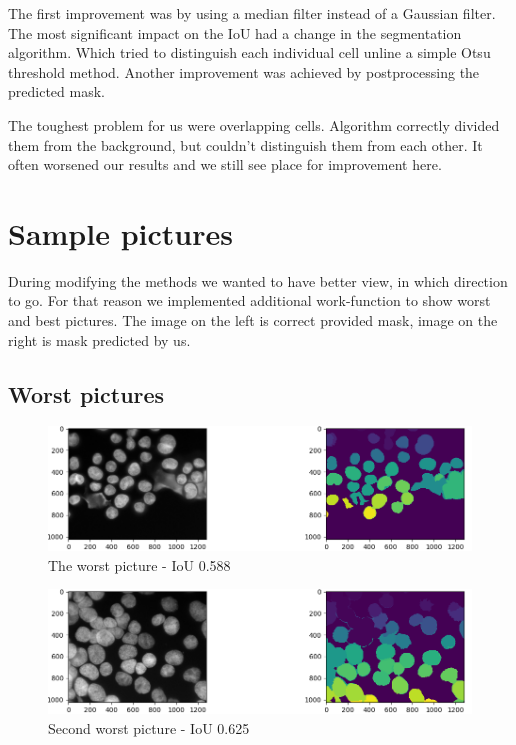 \documentclass{article}
\begin{document}
The first improvement was by using a median filter instead of a Gaussian filter. The most significant impact on the IoU had a change in the segmentation algorithm. Which tried to distinguish each individual cell unline a simple Otsu threshold method. Another improvement was achieved by postprocessing the predicted mask. 

The toughest problem for us were overlapping cells. Algorithm correctly divided them from the background, but couldn't distinguish them from each other. It often worsened our results and we still see place for improvement here.

\newpage
\section{Sample pictures}
During modifying the methods we wanted to have better view, in which direction to go. For that reason we implemented additional work-function to show worst and best pictures. The image on the left is correct provided mask, image on the right is mask predicted by us. 


\subsection{Worst pictures}
\begin{figure}[H]
\centering
\includegraphics[width=\textwidth]{figures/1_worst.png}
\caption{The worst picture - IoU 0.588}
\end{figure}

\begin{figure}[H]
\centering
\includegraphics[width=\textwidth]{figures/2_worst.png}
\caption{Second worst picture - IoU 0.625}
\end{figure}
\end{document}
